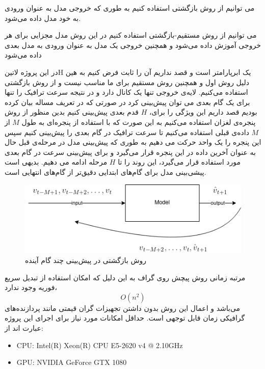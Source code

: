  می توانیم از روش بازگشتی  استفاده کنیم به طوری که خروجی مدل به عنوان ورودی به خود مدل داده می‌شود.

 می توانیم از روش مستقیم-بازگشتی  استفاده کنیم در این روش مدل مجزایی برای هر خروجی آموزش داده می‌شود و همچنین خروجی یک مدل به عنوان ورودی به مدل بعدی داده می‌شود


در این پروژه ‌لاتین{‌H} یک ابرپارامتر است و قصد نداریم آن را ثابت فرض کنیم به هین دلیل روش اول و همچنین روش مستقیم برای ما مناسب نیست و از روش بازگشتی استفاده می‌کنیم. لایه‌ی خروجی تنها یک کانال دارد و در نتیجه سرعت ترافیک را تنها برای یک گام بعدی می توان پیش‌بینی کرد در صورتی که در تعریف مساله بیان کرده بودیم قصد داریم این ویژگی را برای، $H$ قدم بعدی پیش‌بینی کنیم بدین منظور از روش پنجره‌ی لغزان استفاده می‌کنیم به این صورت که با استفاده از پنجره‌ای به طول $M$ از $M$ داده‌ی قبلی استفاده می‌کنیم تا سرعت ترافیک در گام بعدی را پیش‌بینی کنیم سپس این پنجره را یک واحد حرکت می دهیم به طوری که پیش‌بینی مدل در مرحله‌ی قبل حال به عنوان آخرین داده در این پنجره قرار می‌گیرد و برای پیش‌بینی سرعت در گام بعدی مورد استفاده قرار می‌گیرد، این روند را تا $H$ مرحله ادامه می دهیم. بدیهی است پیشی‌بینی مدل برای گام‌های ابتدایی دقیق‌تر از گام‌های انتهایی است.


\begin{figure}
  \includegraphics[width=\textwidth]{./images/recursive.png}
  \centering
  \caption{
روش بازگشتی در پیش‌بینی چند گام آینده }
  \label{fig:blocks}
\end{figure}


مرتبه زمانی روش پیچش روی گراف به این دلیل که امکان استفاده از تبدیل سریع فوریه وجود ندارد،
\[
  O(n^{2})
\]
می‌باشد و اعمال این روش بدون داشتن تجهیزات گران قیمتی مانند پردازنده‌های گرافیکی زمان قابل توجهی است. حداقل امکانات مورد نیاز برای اجرای این پروژه عبارت اند از:

\begin{latin}\begin{itemize}
\item CPU: Intel(R) Xeon(R) CPU E5-2620 v4 @ 2.10GHz
\item GPU: NVIDIA GeForce GTX 1080
\end{itemize}\end{latin}

